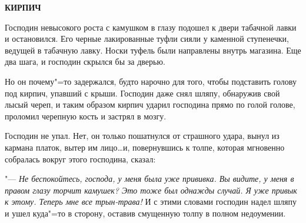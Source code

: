 \begin{center}
    \textbf{КИРПИЧ}
\end{center}

Господин  невысокого роста с камушком  в глазу подошел к двери табачной лавки и остановился. Его черные лакированные туфли сияли у каменной ступенечки,  ведущей  в  табачную лавку. Носки туфель были  направлены  внутрь магазина.  Еще два шага,  и господин скрылся бы за дверью.

Но он почему"=то задержался, будто нарочно  для  того,  чтобы подставить голову  под
кирпич, упавший с крыши.  Господин даже снял шляпу, обнаружив свой лысый череп,  и  таким
образом кирпич ударил господина прямо по голой голове,  проломил черепную кость и застрял в мозгу.

Господин не упал.  Нет, он только пошатнулся от страшного удара,  вынул из  кармана
платок, вытер им лицо\dots  и,  повернувшись к толпе,  которая мгновенно  собралась  вокруг этого господина, сказал:

"--- \textit{Не беспокойтесь, господа,  у меня была  уже  прививка.  Вы видите,  у меня в  правом глазу торчит камушек?  Это тоже был  однажды случай. Я уже привык к этому. Теперь мне все трын-трава!} И с этими словами господин надел шляпу и ушел  куда"=то  в сторону, оставив  смущенную толпу в полном недоумении.